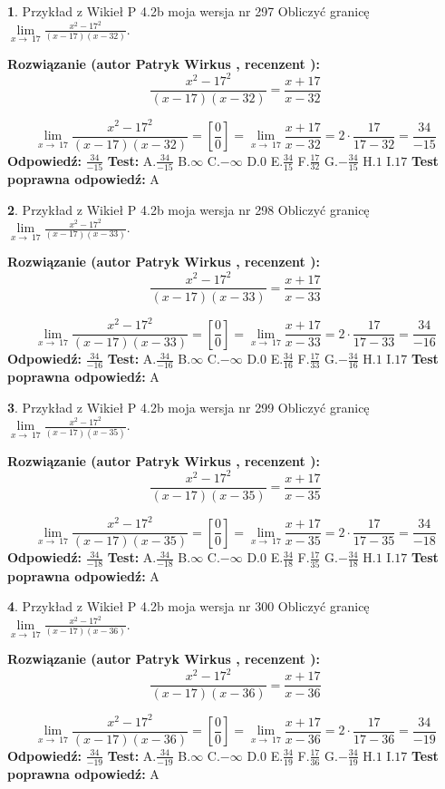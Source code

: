 \documentclass[12pt, a4paper]{article}
\theoremstyle{definition} %
\newtheorem{zad}{}
\newcommand{\zadStart}[1]{\begin{zad}#1\newline}
\newcommand{\zadStop}{\end{zad}}
\newcommand{\rozwStart}[2]{\noindent \textbf{Rozwiązanie (autor #1 , recenzent #2): }\newline}
\newcommand{\rozwStop}{\newline}
\newcommand{\odpStart}{\noindent \textbf{Odpowiedź:}\newline}
\newcommand{\odpStop}{\newline}
\newcommand{\testStart}{\noindent \textbf{Test:}\newline}
\newcommand{\testStop}{\newline}
\newcommand{\kluczStart}{\noindent \textbf{Test poprawna odpowiedź:}\newline}
\newcommand{\kluczStop}{\newline}
\begin{document}
\zadStart{Przykład z Wikieł P 4.2b moja wersja nr 297}
Obliczyć granicę $\lim\limits_{x\to\ 17}\frac{x^{2}-17^{2}}{(x-17)(x-32)}$.
\zadStop
\rozwStart{Patryk Wirkus}{}
$$\frac{x^{2}-17^{2}}{(x-17)(x-32)}=\frac{x+17}{x-32}$$

$$\lim\limits_{x\to\ 17}\frac{x^{2}-17^{2}}{(x-17)(x-32)}=[\frac{0}{0}]=\lim\limits_{x\to\ 17}\frac{x+17}{x-32}=2 \cdot \frac{17}{17-32} = \frac{34}{-15}$$
\rozwStop
\odpStart
$\frac{34}{-15}$
\odpStop
\testStart
A.$\frac{34}{-15}$
B.$\infty$
C.$-\infty$
D.$0$
E.$\frac{34}{15}$
F.$\frac{17}{32}$
G.$-\frac{34}{15}$
H.$1$
I.$17$
\testStop
\kluczStart
A
\kluczStop



\zadStart{Przykład z Wikieł P 4.2b moja wersja nr 298}
Obliczyć granicę $\lim\limits_{x\to\ 17}\frac{x^{2}-17^{2}}{(x-17)(x-33)}$.
\zadStop
\rozwStart{Patryk Wirkus}{}
$$\frac{x^{2}-17^{2}}{(x-17)(x-33)}=\frac{x+17}{x-33}$$

$$\lim\limits_{x\to\ 17}\frac{x^{2}-17^{2}}{(x-17)(x-33)}=[\frac{0}{0}]=\lim\limits_{x\to\ 17}\frac{x+17}{x-33}=2 \cdot \frac{17}{17-33} = \frac{34}{-16}$$
\rozwStop
\odpStart
$\frac{34}{-16}$
\odpStop
\testStart
A.$\frac{34}{-16}$
B.$\infty$
C.$-\infty$
D.$0$
E.$\frac{34}{16}$
F.$\frac{17}{33}$
G.$-\frac{34}{16}$
H.$1$
I.$17$
\testStop
\kluczStart
A
\kluczStop



\zadStart{Przykład z Wikieł P 4.2b moja wersja nr 299}
Obliczyć granicę $\lim\limits_{x\to\ 17}\frac{x^{2}-17^{2}}{(x-17)(x-35)}$.
\zadStop
\rozwStart{Patryk Wirkus}{}
$$\frac{x^{2}-17^{2}}{(x-17)(x-35)}=\frac{x+17}{x-35}$$

$$\lim\limits_{x\to\ 17}\frac{x^{2}-17^{2}}{(x-17)(x-35)}=[\frac{0}{0}]=\lim\limits_{x\to\ 17}\frac{x+17}{x-35}=2 \cdot \frac{17}{17-35} = \frac{34}{-18}$$
\rozwStop
\odpStart
$\frac{34}{-18}$
\odpStop
\testStart
A.$\frac{34}{-18}$
B.$\infty$
C.$-\infty$
D.$0$
E.$\frac{34}{18}$
F.$\frac{17}{35}$
G.$-\frac{34}{18}$
H.$1$
I.$17$
\testStop
\kluczStart
A
\kluczStop



\zadStart{Przykład z Wikieł P 4.2b moja wersja nr 300}
Obliczyć granicę $\lim\limits_{x\to\ 17}\frac{x^{2}-17^{2}}{(x-17)(x-36)}$.
\zadStop
\rozwStart{Patryk Wirkus}{}
$$\frac{x^{2}-17^{2}}{(x-17)(x-36)}=\frac{x+17}{x-36}$$

$$\lim\limits_{x\to\ 17}\frac{x^{2}-17^{2}}{(x-17)(x-36)}=[\frac{0}{0}]=\lim\limits_{x\to\ 17}\frac{x+17}{x-36}=2 \cdot \frac{17}{17-36} = \frac{34}{-19}$$
\rozwStop
\odpStart
$\frac{34}{-19}$
\odpStop
\testStart
A.$\frac{34}{-19}$
B.$\infty$
C.$-\infty$
D.$0$
E.$\frac{34}{19}$
F.$\frac{17}{36}$
G.$-\frac{34}{19}$
H.$1$
I.$17$
\testStop
\kluczStart
A
\kluczStop
\end{document}
